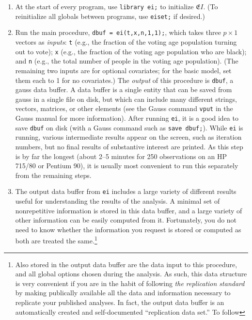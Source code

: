 \documentclass[11pt,titlepage]{article}
\newcommand{\EI}{\ensuremath{{\mathfrak EI}}}
\begin{document}
\begin{enumerate}
\item At the start of every program, use \texttt{library
    ei;} to initialize \EI.  (To reinitialize all globals
  between programs, use \texttt{eiset;} if desired.)
\item Run the main procedure, \texttt{dbuf = ei(t,x,n,1,1);}, which
  takes three $p\times 1$ vectors as \emph{inputs}: \texttt{t} (e.g.,
  the fraction of the voting age population turning out to vote);
  \texttt{x} (e.g., the fraction of the voting age population who are
  black); and \texttt{n} (e.g., the total number of people in the
  voting age population).  (The remaining two inputs are for optional
  covariates; for the basic model, set them each to 1 for no
  covariates.)  The \emph{output} of this procedure is \texttt{dbuf},
  a gauss data buffer.  A data buffer is a single entity that can be
  saved from gauss in a single file on disk, but which can include
  many different strings, vectors, matrices, or other elements (see
  the Gauss command \texttt{vput} in the Gauss manual for more
  information).  After running \texttt{ei}, it is a good idea to save
  \texttt{dbuf} on disk (with a Gauss command such as \texttt{save
    dbuf;}).  While \texttt{ei} is running, various intermediate
  results appear on the screen, such as iteration numbers, but no
  final results of substantive interest are printed.  As this step is
  by far the longest (about 2--5 minutes for 250 observations on an HP
  715/80 or Pentium 90), it is usually most convenient to run this
  separately from the remaining steps.
\item The output data buffer from \texttt{ei} includes a large variety
  of different results useful for understanding the results of the
  analysis. A minimal set of nonrepetitive information is stored in
  this data buffer, and a large variety of other information can be
  easily computed from it.  Fortunately, you do not need to know
  whether the information you request is stored or computed as both
  are treated the same.\footnote{Also stored in the output data buffer
    are the data input to this procedure, and all global options
    chosen during the analysis.  As such, this data structure is very
    convenient if you are in the habit of following \emph{the
      replication standard} by making publically available all the
    data and information necessary to replicate your published
    analyses.  In fact, the output data buffer is an automatically
    created and self-documented ``replication data set.'' To follow
}
\end{enumerate}
\end{document}
